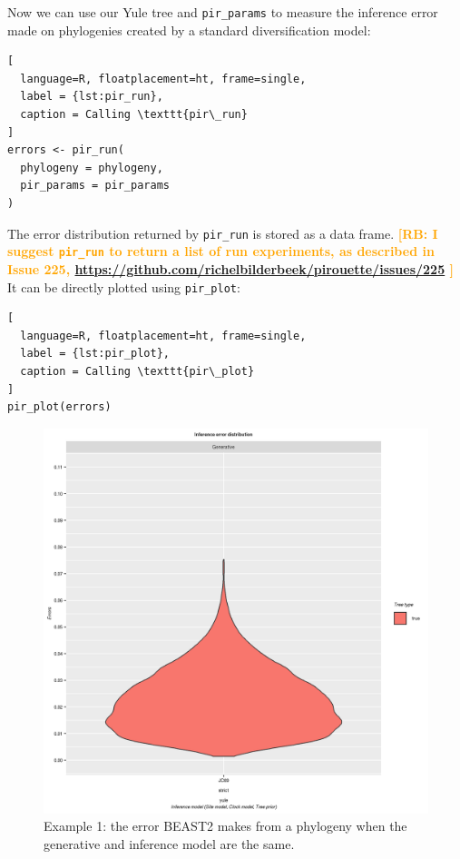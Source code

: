 \documentclass{article}
\newcommand{\richel}[1]{\textcolor{orange}{\textbf{[RB: #1]}}}
\begin{document}
Now we can use our Yule tree and \verb;pir_params; to measure 
the inference error made on phylogenies
created by a standard diversification model:

\begin{lstlisting}[
  language=R, floatplacement=ht, frame=single,
  label = {lst:pir_run},
  caption = Calling \texttt{pir\_run}
]
errors <- pir_run(
  phylogeny = phylogeny,
  pir_params = pir_params
)
\end{lstlisting}

The error distribution returned by \verb;pir_run; is stored as a data frame. 
\richel{
  I suggest \texttt{pir\_run} to return a list of run experiments,
  as described in Issue 225, 
  \url{https://github.com/richelbilderbeek/pirouette/issues/225}
}
It can be directly plotted using \verb;pir_plot;:

\begin{lstlisting}[
  language=R, floatplacement=ht, frame=single,
  label = {lst:pir_plot},
  caption = Calling \texttt{pir\_plot}
]
pir_plot(errors)
\end{lstlisting}

\begin{figure}[ht]
  \includegraphics[width=\textwidth]{example_1/errors.png}
  \caption{
    Example 1: the error BEAST2 makes from a phylogeny 
    when the generative and inference model are the same.
  }
  \label{fig:example_1}
\end{figure}
\end{document}
